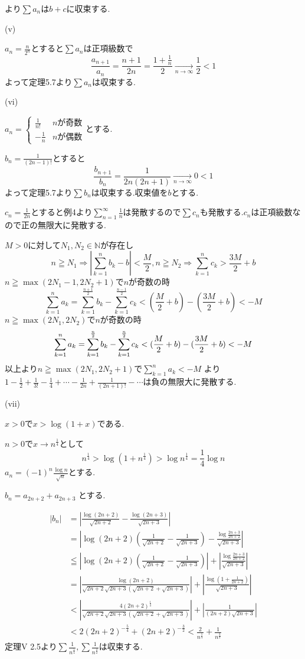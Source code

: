\documentclass{jsarticle}
\begin{document}
より$\sum a_n$は$b+c$に収束する.

(v)

$a_n=\frac{n}{2^n}$とすると$\sum a_n$は正項級数で
\[\frac{a_{n+1}}{a_n}=\frac{n+1}{2n}=\frac{1+\frac{1}{n}}{2}\xrightarrow[n\to\infty]{}\frac{1}{2}<1\]
よって定理5.7より$\sum a_n$は収束する.

(vi)

$a_n = \begin{cases}
\frac{1}{n!} & nが奇数 \\
-\frac{1}{n} & nが偶数　
\end{cases}$とする.

$b_n=\frac{1}{(2n-1)!}$とすると
\[\frac{b_{n+1}}{b_n}=\frac{1}{2n(2n+1)}\xrightarrow[n\to\infty]{}0<1\]
よって定理5.7より$\sum b_n$は収束する.収束値を$b$とする.

$c_n=\frac{1}{2n}$とすると例4より$\displaystyle \sum_{n=1}^\infty \frac{1}{n}$は発散するので$\sum c_n$も発散する.$c_n$は正項級数なので正の無限大に発散する.

$M > 0$に対して$N_1,N_2\in\mathbb{N}$が存在し
\[n\geqq N_1 \Rightarrow |\sum_{k=1}^nb_k-b| < \frac{M}{2},n\geqq N_2 \Rightarrow \sum_{k=1}^nc_k > \frac{3M}{2}+b\]
$n\geqq \max (2N_1-1,2N_2+1)$で$n$が奇数の時
\[\sum_{k=1}^n a_k = \sum_{k=1}^{\frac{n+1}{2}} b_k - \sum_{k=1}^{\frac{n-1}{2}}c_k
< (\frac{M}{2}+b) - (\frac{3M}{2}+b) < -M\]
$n\geqq \max (2N_1,2N_2)$で$n$が奇数の時
\[
\sum_{k=1}^n a_k = \sum_{k=1}^{\frac{n}{2}} b_k - \sum_{k=1}^{\frac{n}{2}}c_k\\
< (\frac{M}{2}+b) - (\frac{3M}{2}+b) < -M
\]
以上より$n\geqq \max (2N_1,2N_2+1)$で$\displaystyle\sum_{k=1}^n a_k < -M$
より$1-\frac{1}{2}+\frac{1}{3!}-\frac{1}{4}+\cdots -\frac{1}{2n}+\frac{1}{(2n+1)!}-\cdots$は負の無限大に発散する.

(vii)

$x > 0$で$x >\log (1+x)$である.

$n > 0$で$x\rightarrow n^{\frac{1}{4}}$として
\[n^\frac{1}{4} > \log (1+n^\frac{1}{4}) >\log n^\frac{1}{4} = \frac{1}{4}\log n\]
$a_n = (-1)^n\frac{\log n}{\sqrt{n}}$とする.

$b_n=a_{2n+2}+a_{2n+3}$
とする.

\begin{align*}
|b_n| &= |\frac{\log (2n+2)}{\sqrt{2n+2}}-\frac{\log (2n+3)}{\sqrt{2n+3}}|\\
&=|\log (2n+2) (\frac{1}{\sqrt{2n+2}}-\frac{1}{\sqrt{2n+3}}) - \frac{\log \frac{2n+3}{2n+2}}{\sqrt{2n+3}}|\\
&\leqq |\log (2n+2) (\frac{1}{\sqrt{2n+2}}-\frac{1}{\sqrt{2n+3}})| +| \frac{\log \frac{2n+3}{2n+2}}{\sqrt{2n+3}}|\\
&= |\frac{\log (2n+2)}{\sqrt{2n+2}\sqrt{2n+3}(\sqrt{2n+2}+\sqrt{2n+3})}| +|\frac{\log (1+\frac{1}{2n+2})}{\sqrt{2n+3}}|\\
& < |\frac{4(2n+2)^{\frac{1}{4}}}{\sqrt{2n+2}\sqrt{2n+3}(\sqrt{2n+2}+\sqrt{2n+3})}|+|\frac{1}{(2n+2)\sqrt{2n+3}}|\\
& < 2(2n+2)^{-\frac{5}{4}}+(2n+2)^{-\frac{3}{2}}<\frac{2}{n^\frac{5}{4}}+\frac{1}{n^\frac{3}{2}}
\end{align*}
定理V 2.5より$\sum \frac{1}{n^{\frac{5}{4}}},\sum \frac{1}{n^{\frac{3}{2}}}$は収束する.
\end{document}

